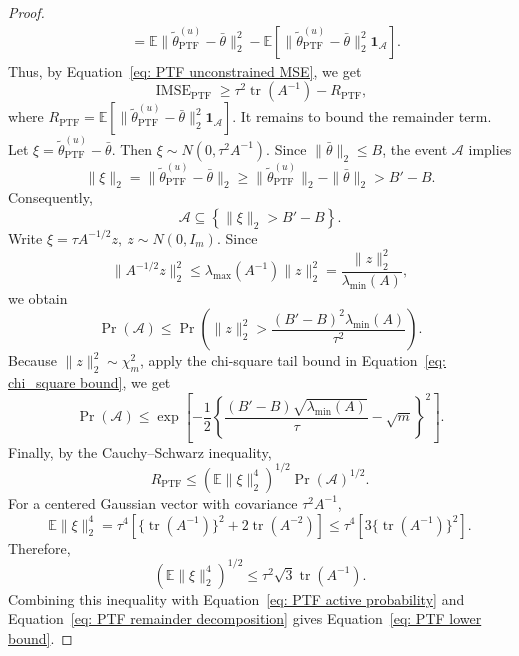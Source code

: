 \begin{proof}
\[\begin{aligned}
&=
\mathbb E\|\widetilde\theta_{\mathrm{PTF}}^{(u)}-\bar\theta\|_2^2
-
\mathbb E[
\|\widetilde\theta_{\mathrm{PTF}}^{(u)}-\bar\theta\|_2^2
\mathbf 1_{\mathcal A}].
\end{aligned}
\]
Thus, by Equation~\eqref{eq: PTF unconstrained MSE}, we get
\begin{equation}
\operatorname{IMSE}_{\mathrm{PTF}}
\geq
\tau^2\operatorname{tr}(A^{-1})
-
R_{\mathrm{PTF}},
\label{eq: PTF remainder decomposition}
\end{equation}
where $R_{\mathrm{PTF}}
=
\mathbb E[
\|\widetilde\theta_{\mathrm{PTF}}^{(u)}-\bar\theta\|_2^2
\mathbf 1_{\mathcal A}]$. It remains to bound the remainder term. Let $\xi=\widetilde\theta_{\mathrm{PTF}}^{(u)}-\bar\theta$. Then $\xi\sim N(0,\tau^2A^{-1})$. Since $\|\bar\theta\|_2\le B$, the event $\mathcal A$ implies
\[
\|\xi\|_2
=
\|\widetilde\theta_{\mathrm{PTF}}^{(u)}-\bar\theta\|_2
\geq
\|\widetilde\theta_{\mathrm{PTF}}^{(u)}\|_2-\|\bar\theta\|_2
>
B'-B.
\]
Consequently,
\[
\mathcal A
\subseteq
\left\{
\|\xi\|_2>B'-B
\right\}.
\]
Write $\xi=\tau A^{-1/2}z,
\ 
z\sim N(0,I_m)$. Since
\[
\|A^{-1/2}z\|_2^2
\leq
\lambda_{\max}(A^{-1})\|z\|_2^2
=
\frac{\|z\|_2^2}
{\lambda_{\min}(A)},
\]
we obtain
\[
\Pr(\mathcal A)
\leq
\Pr\left(
\|z\|_2^2
>
\frac{(B'-B)^2\lambda_{\min}(A)}
{\tau^2}
\right).
\]
Because $\|z\|_2^2\sim\chi_m^2$, apply the chi-square tail bound in Equation~\eqref{eq: chi_square bound}, we get
\begin{equation}
\Pr(\mathcal A)
\leq
\exp\left[
-\frac12
\left\{
\frac{(B'-B)\sqrt{\lambda_{\min}(A)}}{\tau}
-\sqrt m
\right\}^2
\right].
\label{eq: PTF active probability}
\end{equation}
Finally, by the Cauchy--Schwarz inequality,
\[
R_{\mathrm{PTF}}
\leq
\left(
\mathbb E\|\xi\|_2^4
\right)^{1/2}
\Pr(\mathcal A)^{1/2}.
\]
For a centered Gaussian vector with covariance
$\tau^2A^{-1}$,
\[
\mathbb E\|\xi\|_2^4
=
\tau^4
\left[
\{\operatorname{tr}(A^{-1})\}^2
+
2\operatorname{tr}(A^{-2})
\right]
\le 
\tau^4 [3\{\operatorname{tr}(A^{-1})\}^2].
\]
Therefore,
\[
\left(
\mathbb E\|\xi\|_2^4
\right)^{1/2}
\leq
\tau^2
\sqrt{3}\operatorname{tr}(A^{-1}).
\]
Combining this inequality with Equation~\eqref{eq: PTF active probability}
and Equation~\eqref{eq: PTF remainder decomposition} gives
Equation~\eqref{eq: PTF lower bound}.
\end{proof}

